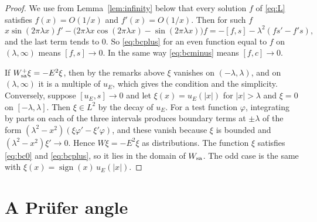 \documentclass[11pt]{amsart}
\theoremstyle{definition}
\begin{document}
\begin{proof}
We use from Lemma~\ref{lem:infinity} below that every solution $f$ of \eqref{eq:L} satisfies $f(x)=O(1/x)$ and $f'(x)=O(1/x)$. Then for such $f$
\[
x\sin(2\pi\lambda x)f'-\big(2\pi\lambda x\cos(2\pi\lambda x)-\sin(2\pi\lambda x)\big)f=-[f,s]-\lambda^2(fs'-f's),
\]
and the last term tends to $0$. So \eqref{eq:bcplus} for an even function equal to $f$ on $(\lambda,\infty)$ means $[f,s]\to0$. In the same way \eqref{eq:bcminus} means $[f,c]\to0$.

If $W_{\rm sa}^+\xi=-E^2\xi$, then by the remarks above $\xi$ vanishes on $(-\lambda,\lambda)$, and on $(\lambda,\infty)$ it is a multiple of $u_E$, which gives the condition and the simplicity. Conversely, suppose $[u_E,s]\to0$ and let $\xi(x)=u_E(|x|)$ for $|x|>\lambda$ and $\xi=0$ on $[-\lambda,\lambda]$. Then $\xi\in L^2$ by the decay of $u_E$. For a test function $\varphi$, integrating by parts on each of the three intervals produces boundary terms at $\pm\lambda$ of the form $(\lambda^2-x^2)(\xi\varphi'-\xi'\varphi)$, and these vanish because $\xi$ is bounded and $(\lambda^2-x^2)\xi'\to0$. Hence $W\xi=-E^2\xi$ as distributions. The function $\xi$ satisfies \eqref{eq:bc0} and \eqref{eq:bcplus}, so it lies in the domain of $W_{\rm sa}$. The odd case is the same with $\xi(x)=\operatorname{sign}(x)\,u_E(|x|)$.
\end{proof}

\section{A Pr\"ufer angle}\label{sec:prufer}
\end{document}
